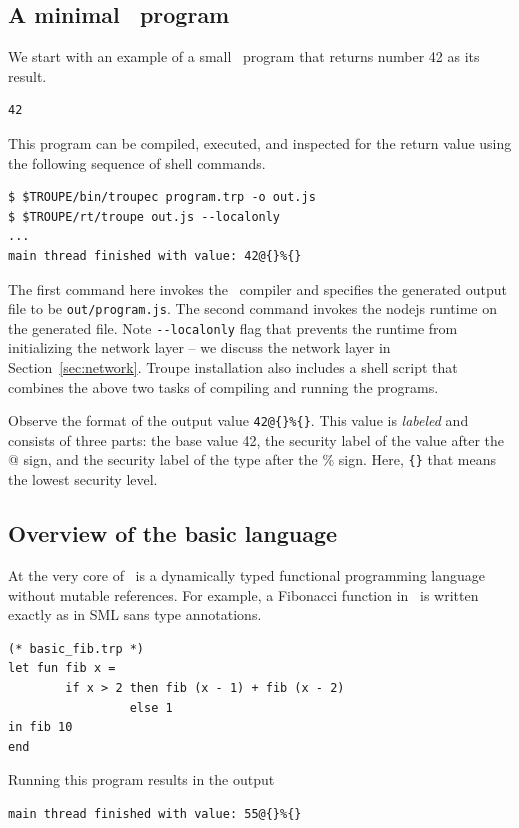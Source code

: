 \subsection{A minimal \troupelang\ program}


We start with an example of a small \troupelang\ program that returns number 42 as its result.
\begin{verbatim}
42
\end{verbatim}

This program can be compiled, executed, and inspected for the return value using the following sequence of shell commands.
\begin{verbatim}
$ $TROUPE/bin/troupec program.trp -o out.js
$ $TROUPE/rt/troupe out.js --localonly 
...
main thread finished with value: 42@{}%{}
\end{verbatim}

The first command here invokes the \troupelang\ compiler and specifies the generated output file to be {\tt out/program.js}.
The second command invokes the nodejs runtime on the generated file. Note {\tt {-}{-}localonly} flag that 
prevents the runtime from initializing the network layer -- we discuss the network layer in Section~\ref{sec:network}.
Troupe installation also includes a shell script  that combines the above two tasks of compiling 
and running the programs.

Observe the format of the output value {\tt 42@\{\}\%\{\}}. This value is \emph{labeled} and consists of three 
parts: the base value 42, the security label of the value after the @ sign, 
and the security label of the type after the \% sign. Here,  {\tt \{\}} that means the lowest security level.



\subsection{Overview of the basic language}
At the very core of \troupelang\ is a dynamically typed functional programming language without mutable references. 
For example, a Fibonacci function in \troupelang\ is written exactly as in SML sans type annotations.
\begin{lstlisting}
(* basic_fib.trp *)
let fun fib x = 
        if x > 2 then fib (x - 1) + fib (x - 2)
                 else 1
in fib 10
end
\end{lstlisting}
Running this program results in the output
\begin{verbatim}
main thread finished with value: 55@{}%{}
\end{verbatim}


